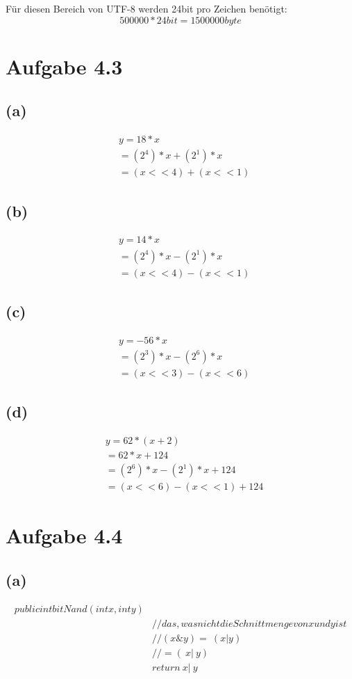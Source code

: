 \documentclass[12pt]{article}
\begin{document}
Für diesen Bereich von UTF-8 werden 24bit pro Zeichen benötigt:
\[500000 * 24bit = 1500000byte\]

\section{Aufgabe 4.3}
\subsection{(a)}
\begin{align}
&y = 18 * x\\
&= (2^4) * x + (2^1) * x\\
&= (x << 4) + (x << 1)
\end{align}
\subsection{(b)}
\begin{align}
&y = 14 * x\\
&= (2^4) * x - (2^1) * x\\
&= (x << 4) - (x << 1)
\end{align}
\subsection{(c)}
\begin{align}
&y = -56 * x\\
&= (2^3) * x - (2^6) * x\\
&= (x << 3) - (x << 6)
\end{align}
\subsection{(d)}
\begin{align}
&y = 62 * (x + 2)\\
&= 62 * x + 124\\
&= (2^6) * x - (2^1) * x + 124\\
&= (x << 6) - (x << 1) + 124
\end{align}

\section{Aufgabe 4.4}
\subsection{(a)}
\begin{align}
public int bitNand(int x,int y)\\
&// das, was nicht die Schnittmenge von x und y ist\\
&// (x\& y)  = ~ (x | y)\\
&// = (~ x | ~ y)\\
&return  ~ x | ~ y
\end{align}
\end{document}
